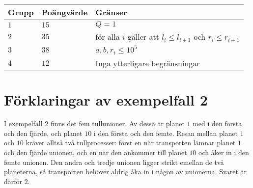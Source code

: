 \noindent
\begin{tabular}{| l | l | l |}
  \hline
  Grupp & Poängvärde & Gränser \\ \hline
  $1$   & $15$        & $Q=1$  \\ \hline
  $2$   & $35$        & för alla $i$ gäller att $l_i \le l_{i + 1}$ och $r_i \le r_{i+1}$ \\ \hline
  $3$   & $38$       & $ a,b,r_i \leq 10^5$ \\ \hline
  $4$   & $12$       & Inga ytterligare begränsningar \\ \hline
\end{tabular}

\section*{Förklaringar av exempelfall 2}
I exempelfall $2$ finns det fem tullunioner.
Av dessa är planet $1$ med i den första och den fjärde, och planet $10$ i den första och den femte.
Resan mellan planet $1$ och $10$ kräver alltså två tullprocesser: först en när transporten lämnar planet $1$ och den fjärde unionen, och en när den ankommer till planet $10$ och åker in i den femte unionen.
Den andra och tredje unionen ligger strikt emellan de två planeterna, så transporten behöver aldrig åka in i någon av unionerna.
Svaret är därför $2$.
